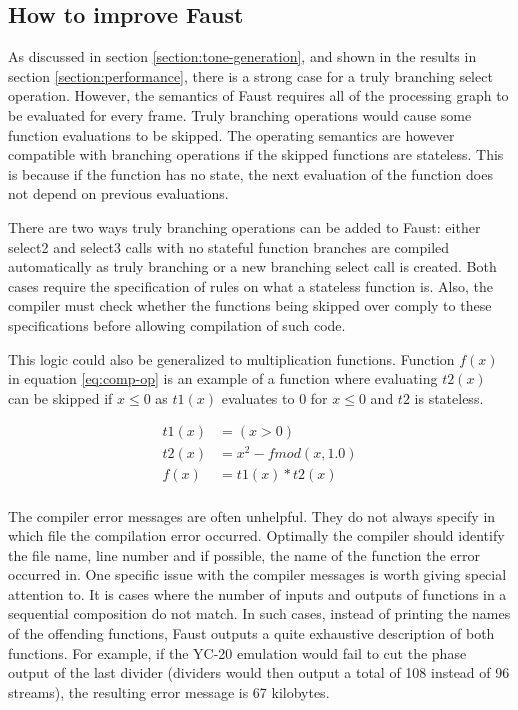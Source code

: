 \documentclass[11pt,a4paper]{article}
\begin{document}
\subsection{How to improve Faust}

As discussed in section \ref{section:tone-generation}, and shown in the results in section \ref{section:performance}, there is a strong case for a truly branching select operation. However, the semantics of Faust requires all of the processing graph to be evaluated for every frame. Truly branching operations would cause some function evaluations to be skipped. The operating semantics are however compatible with branching operations if the skipped functions are stateless. This is because if the function has no state, the next evaluation of the function does not depend on previous evaluations.

There are two ways truly branching operations can be added to Faust: either select2 and select3 calls with no stateful function branches are compiled automatically as truly branching or a new branching select call is created. Both cases require the specification of rules on what a stateless function is. Also, the compiler must check whether the functions being skipped over comply to these specifications before allowing compilation of such code.

This logic could also be generalized to multiplication functions. Function $f(x)$ in equation \ref{eq:comp-op} is an example of a function where evaluating $t2(x)$ can be skipped if $x \leq 0$ as $t1(x)$ evaluates to 0 for $x \leq 0 $ and $t2$ is stateless.

\begin{equation}
\label{eq:comp-op}
\begin{split}
t1(x) &= (x>0) \\
t2(x) &= x^2-fmod(x,1.0) \\
f(x)  &= t1(x) * t2(x) \\
\end{split}
\end{equation}


The compiler error messages are often unhelpful. They do not always specify in which file the compilation error occurred. Optimally the compiler should identify the file name, line number and if possible, the name of the function the error occurred in. One specific issue with the compiler messages is worth giving special attention to. It is cases where the number of inputs and outputs of functions in a sequential composition do not match. In such cases, instead of printing the names of the offending functions, Faust outputs a quite exhaustive description of both functions. For example, if the YC-20 emulation would fail to cut the phase output of the last divider (dividers would then output a total of 108 instead of 96 streams), the resulting error message is 67 kilobytes.
\end{document}

